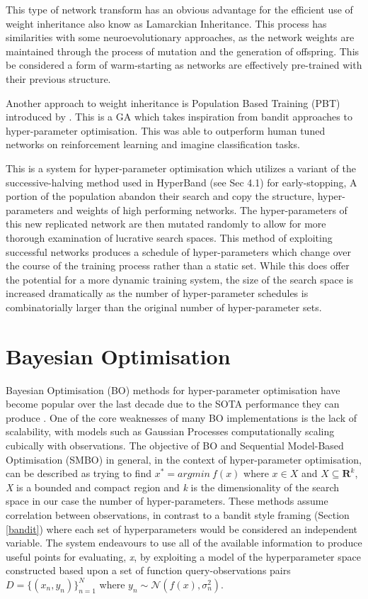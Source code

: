 \documentclass{article}
\begin{document}
		This type of network transform has an obvious advantage for the efficient use of weight inheritance also know as Lamarckian Inheritance. This process has similarities with some neuroevolutionary approaches, as the network weights are maintained through the process of mutation and the generation of offspring. This be considered a form of warm-starting as networks are effectively pre-trained with their previous structure.   

		Another approach to weight inheritance is Population Based Training (PBT) introduced by \cite{39}. This is a GA which takes inspiration from bandit approaches to hyper-parameter optimisation. This was able to outperform human tuned networks on reinforcement learning and imagine classification tasks.
		\par
		This is a system for hyper-parameter optimisation which utilizes a variant of the  successive-halving\cite{SH} method used in HyperBand (see Sec 4.1) for early-stopping, A portion of the population abandon their search and copy the structure, hyper-parameters and weights of high performing networks. The hyper-parameters of this new replicated network are then mutated randomly to allow for more thorough examination of lucrative search spaces. This method of exploiting successful networks produces a schedule of hyper-parameters which change over the course of the training process rather than a static set. While this does offer the potential for a more dynamic training system, the size of the search space is increased dramatically as the number of hyper-parameter schedules is combinatorially larger than the original number of hyper-parameter sets.



\section {Bayesian Optimisation}

	Bayesian Optimisation (BO) methods for hyper-parameter optimisation have become popular over the last decade due to the SOTA performance they can produce \cite{32} \cite{20}. One of the core weaknesses of many BO implementations is the lack of scalability, with models such as Gaussian Processes computationally scaling cubically with observations. The objective of BO and Sequential Model-Based Optimisation (SMBO) in general, in the context of hyper-parameter optimisation, can be described as trying to find \(x^* = argmin~ f(x)\) where \(x \in X\) and \(X \subseteq \mathbf{R} ^k\), \textit{X} is a bounded and compact region and \textit{k} is the dimensionality of the search space in our case the number of hyper-parameters. These methods assume correlation between observations, in contrast to a bandit style framing (Section \ref{bandit}) where each set of hyperparameters would be considered an independent variable. The system endeavours to use all of the available information to produce useful points for evaluating, \textit{x}, by exploiting a model of the hyperparameter space constructed based upon a set of function query-observations pairs \( D = \{(x_n,y_n)\}_{n=1}^N\) where \(y_n \sim \mathcal{N}(f(x), \sigma_n^2) \).
\end{document}
